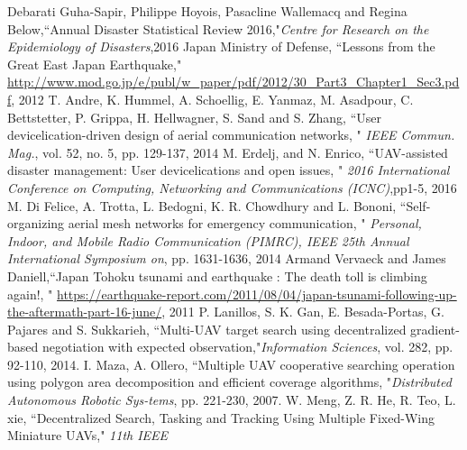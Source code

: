 \documentclass{ieeeaccess}
\begin{document}
%
%
%
\begin{thebibliography}{1}
Debarati Guha-Sapir, Philippe Hoyois, Pasacline Wallemacq and Regina Below,``Annual Disaster Statistical Review 2016,"\emph{Centre for Research on
the Epidemiology of Disasters},2016 
 Japan Ministry of Defense, ``Lessons from the Great East Japan Earthquake," \url{http://www.mod.go.jp/e/publ/w_paper/pdf/2012/30_Part3_Chapter1_Sec3.pdf}, 2012
 T. Andre, K. Hummel, A. Schoellig, E. Yanmaz, M. Asadpour, C. Bettstetter, P. Grippa, H. Hellwagner, S. Sand and S. Zhang, ``User devicelication-driven design of aerial communication networks, " \emph{IEEE Commun. Mag.}, vol. 52, no. 5, pp. 129-137, 2014
 M. Erdelj, and N. Enrico, ``UAV-assisted disaster management: User devicelications and open issues, " \emph{2016 International Conference on Computing, Networking and Communications (ICNC)},pp1-5, 2016
 M. Di Felice, A. Trotta, L. Bedogni, K. R. Chowdhury and L. Bononi, ``Self-organizing aerial mesh networks for emergency communication, " \emph{Personal, Indoor, and Mobile Radio Communication (PIMRC), IEEE 25th Annual International Symposium on}, pp. 1631-1636, 2014
Armand Vervaeck and James Daniell,``Japan Tohoku tsunami and earthquake : The death toll is climbing again!, " \url{https://earthquake-report.com/2011/08/04/japan-tsunami-following-up-the-aftermath-part-16-june/}, 2011
 P. Lanillos, S. K. Gan, E. Besada-Portas, G. Pajares and S. Sukkarieh, ``Multi-UAV target search using decentralized gradient-based negotiation with expected observation,"\emph{Information Sciences}, vol. 282, pp. 92-110, 2014.
 I. Maza, A. Ollero, ``Multiple UAV cooperative searching operation
using polygon area decomposition and efficient coverage algorithms, "\emph{Distributed Autonomous Robotic Sys-tems}, pp. 221-230, 2007.
 W. Meng, Z. R. He, R. Teo, L. xie, ``Decentralized Search, Tasking and Tracking Using Multiple Fixed-Wing Miniature UAVs," \emph{11th IEEE
}
\end{thebibliography}
\end{document}
